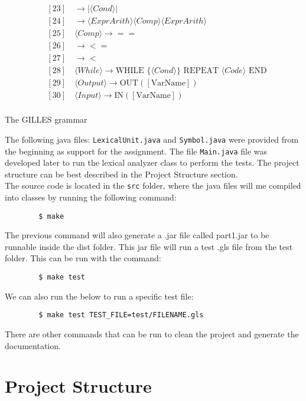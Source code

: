 \documentclass{article}
\begin{document}
\begin{align*}
		&[23] \quad \rightarrow | \langle Cond \rangle | \\
		&[24] \quad \rightarrow \langle ExprArith \rangle \langle Comp \rangle \langle ExprArith \rangle \\
		&[25] \quad \langle Comp \rangle \rightarrow == \\
		&[26] \quad \rightarrow <= \\
		&[27] \quad \rightarrow < \\
		&[28] \quad \langle While \rangle \rightarrow \text{WHILE } \{ \langle Cond \rangle \} \text{ REPEAT } \langle Code \rangle \text{ END} \\
		&[29] \quad \langle Output \rangle \rightarrow \text{OUT}([\text{VarName}]) \\
		&[30] \quad \langle Input \rangle \rightarrow \text{IN}([\text{VarName}]) \\
	\end{align*}

	\begin{table}[h]
		\centering
		\caption{The GILLES grammar}
	\end{table}


	The following java files: \texttt{LexicalUnit.java} and \texttt{Symbol.java} were provided from the beginning as support for the assignment.
	The file \texttt{Main.java} file was developed later to run the lexical analyzer class to perform the tests. The project structure can be best described in the Project Structure section.\\
	
	The source code is located in the \texttt{src} folder, where the java files will me compiled into classes by running the following command:
	\begin{verbatim}
		$ make
	\end{verbatim}
	The previous command will also generate a .jar file called part1.jar to be runnable inside the dist folder. This jar file will run a test .gls file from the test folder. This can be run with the command:
	\begin{verbatim}
		$ make test
	\end{verbatim}
	We can also run the below to run a specific test file:
	\begin{verbatim}
		$ make test TEST_FILE=test/FILENAME.gls
	\end{verbatim}
	There are other commands that can be run to clean the project and generate the documentation.\\

	\section{Project Structure}
	
\end{document}
